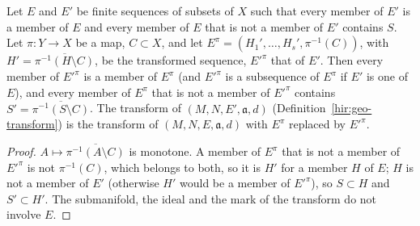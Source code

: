 \begin{lemma}
\label{bcalc:nc-comparison-transform}
\mixedleanok
Let \(E\) and \(E'\) be finite sequences of subsets of \(X\) such that every member of \(E'\) is a member of \(E\) and every member of \(E\) that is not a
member of \(E'\) contains \(S\). Let \(\pi\colon Y\to X\) be a map, \(C\subset X\), and let \(E^\pi=(H_1',\dots,H_s',\pi^{-1}(C))\), with
\(H'=\overline{\pi^{-1}(H\setminus C)}\), be the transformed sequence, \(E'^\pi\) that of \(E'\). Then every member of \(E'^\pi\) is a member of \(E^\pi\)
(and \(E'^\pi\) is a subsequence of \(E^\pi\) if \(E'\) is one of \(E\)), and every member of \(E^\pi\) that is not a member of \(E'^\pi\) contains
\(S'=\overline{\pi^{-1}(S\setminus C)}\). The transform of \((M,N,E',\mathfrak a,d)\) (Definition~\ref{hir:geo-transform}) is the transform of
\((M,N,E,\mathfrak a,d)\) with \(E^\pi\) replaced by \(E'^\pi\).
\end{lemma}
\begin{proof}
\mixedleanok
\(A\mapsto\overline{\pi^{-1}(A\setminus C)}\) is monotone. A member of \(E^\pi\) that is not a member of \(E'^\pi\) is not \(\pi^{-1}(C)\), which belongs to
both, so it is \(H'\) for a member \(H\) of \(E\); \(H\) is not a member of \(E'\) (otherwise \(H'\) would be a member of \(E'^\pi\)), so \(S\subset H\) and
\(S'\subset H'\). The submanifold, the ideal and the mark of the transform do not involve \(E\).
\end{proof}

